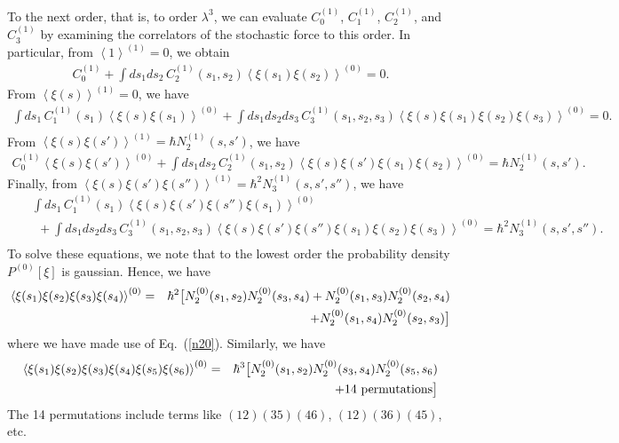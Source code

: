 \documentclass[%
amssymb,preprint,preprintnumbers,nofootinbib,superscriptaddress]{revtex4}
\begin{document}
To the next order, that is, to order $\lambda^{3}$, we can evaluate $C_{0}^{(1)}$, $C_{1}^{(1)}$, $C_{2}^{(1)}$, and $C_{3}^{(1)}$ by examining the correlators of the stochastic force to this order. In particular, from
$
\left\langle 1\right\rangle^{(1)}=0$,
we obtain
\begin{eqnarray}\label{C0}
C_{0}^{(1)}+\int ds_{1} ds_{2}\, C_{2}^{(1)}(s_{1},s_{2})\left\langle\xi(s_{1})\xi(s_{2})\right\rangle^{(0)}=0.
\end{eqnarray}
From
$
\left\langle \xi(s)\right\rangle^{(1)}=0$,
we have
\begin{eqnarray}\label{C1}
\int ds_{1}\, C_{1}^{(1)}(s_{1})\left\langle\xi(s)\xi(s_{1})\right\rangle^{(0)}
+\int ds_{1}ds_{2}ds_{3}\, C_{3}^{(1)}(s_{1},s_{2},s_{3})\left\langle\xi(s)\xi(s_{1})\xi(s_{2})\xi(s_{3})\right\rangle^{(0)}=0.\nonumber\\
\end{eqnarray}
From
$
\left\langle \xi(s)\xi(s')\right\rangle^{(1)}=\hbar N_{2}^{(1)}(s,s')$,
we have
\begin{eqnarray}\label{C2}
C_{0}^{(1)}\left\langle\xi(s)\xi(s')\right\rangle^{(0)}
+\int ds_{1}ds_{2}\, C_{2}^{(1)}(s_{1},s_{2})\left\langle\xi(s)\xi(s')\xi(s_{1})\xi(s_{2})\right\rangle^{(0)}=\hbar N_{2}^{(1)}(s,s').
\end{eqnarray}
Finally, from
$
\left\langle \xi(s)\xi(s')\xi(s'')\right\rangle^{(1)}=\hbar^{2} N_{3}^{(1)}(s,s',s'')$,
we have
\begin{eqnarray}\label{C3}
&&\int ds_{1}\, C_{1}^{(1)}(s_{1})\left\langle\xi(s)\xi(s')\xi(s'')\xi(s_{1})\right\rangle^{(0)}\nonumber\\
&&\ \ +\int ds_{1}ds_{2}ds_{3}\, C_{3}^{(1)}(s_{1},s_{2},s_{3})\left\langle\xi(s)\xi(s')\xi(s'')\xi(s_{1})\xi(s_{2})\xi(s_{3})\right\rangle^{(0)}
=\hbar^{2} N_{3}^{(1)}(s,s',s'').\nonumber\\
\end{eqnarray}
To solve these equations, we note that to the lowest order the probability density $P^{(0)}[\xi]$ is gaussian. Hence, we have
\begin{eqnarray}
\left\langle\xi(s_{1})\xi(s_{2})\xi(s_{3})\xi(s_{4})\right\rangle^{(0)}&=&\hbar^{2}\big[N_{2}^{(0)}(s_{1},s_{2})N_{2}^{(0)}(s_{3},s_{4})+N_{2}^{(0)}(s_{1},s_{3})N_{2}^{(0)}(s_{2},s_{4})\nonumber\\
&&\hskip 20pt +N_{2}^{(0)}(s_{1},s_{4})N_{2}^{(0)}(s_{2},s_{3})\big]
\end{eqnarray}
where we have made use of Eq.~(\ref{n20}). Similarly, we have
\begin{eqnarray}    \left\langle\xi(s_{1})\xi(s_{2})\xi(s_{3})\xi(s_{4})\xi(s_{5})\xi(s_{6})\right\rangle^{(0)}
&=&\hbar^{3}\big[N_{2}^{(0)}(s_{1},s_{2})N_{2}^{(0)}(s_{3},s_{4})N_{2}^{(0)}(s_{5},s_{6})\nonumber\\
&&\hskip 20pt+{\rm 14\ permutations}\big]
\end{eqnarray}
The 14 permutations include terms like $(12)(35)(46)$, $(12)(36)(45)$, etc. 
\end{document}
